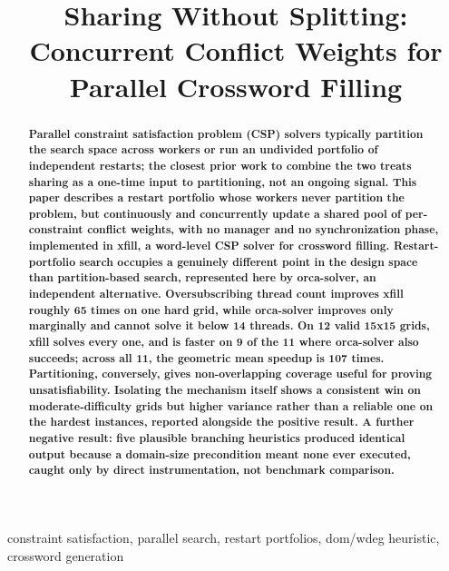 \documentclass[conference]{IEEEtran}
\begin{document}
\title{Sharing Without Splitting: Concurrent Conflict Weights for Parallel Crossword Filling}

\author{
}


\maketitle

\begin{abstract}
\textbf{Parallel constraint satisfaction problem (CSP) solvers typically partition the search space across workers or run an undivided portfolio of independent restarts; the closest prior work to combine the two treats sharing as a one-time input to partitioning, not an ongoing signal. This paper describes a restart portfolio whose workers never partition the problem, but continuously and concurrently update a shared pool of per-constraint conflict weights, with no manager and no synchronization phase, implemented in xfill, a word-level CSP solver for crossword filling. Restart-portfolio search occupies a genuinely different point in the design space than partition-based search, represented here by orca-solver, an independent alternative. Oversubscribing thread count improves xfill roughly 65 times on one hard grid, while orca-solver improves only marginally and cannot solve it below 14 threads. On 12 valid 15x15 grids, xfill solves every one, and is faster on 9 of the 11 where orca-solver also succeeds; across all 11, the geometric mean speedup is 107 times. Partitioning, conversely, gives non-overlapping coverage useful for proving unsatisfiability. Isolating the mechanism itself shows a consistent win on moderate-difficulty grids but higher variance rather than a reliable one on the hardest instances, reported alongside the positive result. A further negative result: five plausible branching heuristics produced identical output because a domain-size precondition meant none ever executed, caught only by direct instrumentation, not benchmark comparison.}
\end{abstract}

\begin{IEEEkeywords}
constraint satisfaction, parallel search, restart portfolios, dom/wdeg heuristic, crossword generation
\end{IEEEkeywords}
\end{document}
